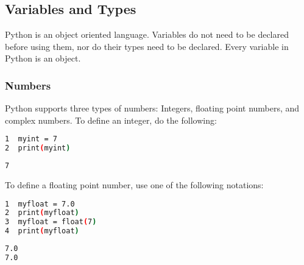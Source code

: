 \documentclass[crop=false,class=book]{standalone}
\begin{document}
\subsection{Variables and Types}
Python is an object oriented language. Variables do not need to be declared before using them, nor do their types need to be declared. Every variable in Python is an object.
\subsubsection{Numbers}
Python supports three types of numbers: Integers, floating point numbers, and complex numbers. To define an integer, do the following:\newline
\begin{minipage}[t]{.48\textwidth}
\centering
\begin{lstlisting}[language=bash,basicstyle=\small\ttfamily,frame=single,caption=input]
1  myint = 7
2  print(myint)
\end{lstlisting}
\end{minipage}\hfill
\begin{minipage}[t]{.48\textwidth}
\centering
\begin{lstlisting}[language=bash,basicstyle=\small\ttfamily,frame=single,caption=output]
7
\end{lstlisting}
\end{minipage}\newline
To define a floating point number, use one of the following notations:\newline
\begin{minipage}[t]{.48\textwidth}
\centering
\begin{lstlisting}[language=bash,basicstyle=\small\ttfamily,frame=single,caption=input]
1  myfloat = 7.0
2  print(myfloat)
3  myfloat = float(7)
4  print(myfloat)
\end{lstlisting}
\end{minipage}\hfill
\begin{minipage}[t]{.48\textwidth}
\centering
\begin{lstlisting}[language=bash,basicstyle=\small\ttfamily,frame=single,caption=output]
7.0
7.0
\end{lstlisting}
\end{minipage}
\end{document}
